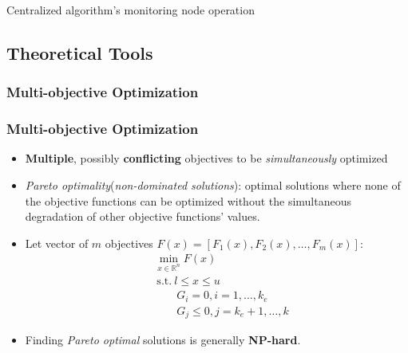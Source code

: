 \documentclass[hyperref={pdfpagelabels=false}]{beamer}
\begin{document}
\begin{frame}[plain]
{\begin{minipage}{\linewidth}
\begin{algorithm}[H]
{{{		


		}
	}
}
\caption{Centralized algorithm's monitoring node operation \label{algo:centralizedMonitoringNode}} 
\end{algorithm}
\end{minipage}%
}
\end{frame}

\subsection{Theoretical Tools}
\subsubsection*{Multi-objective Optimization}
\begin{frame} \frametitle{Multi-objective Optimization}
\begin{itemize}
\item \textbf{Multiple}, possibly \textbf{conflicting} objectives to be \emph{simultaneously} optimized
\item \emph{Pareto optimality}(\emph{non-dominated solutions}): optimal solutions where none of the objective functions can be optimized without the simultaneous degradation of other objective functions' values.
\item Let vector of $m$ objectives $F(x)=[F_1(x), F_2(x), \dots, F_m(x)]$:
\begin{align*}
&\min_{x \in \mathbb{R}^n}{F(x)}\\
&\ \text{s.t.}\ l\leq x \leq u \\
			&\qquad G_i=0, i=1,\dots,k_e\\
			&\qquad G_j\leq 0, j=k_e+1, \dots,k
\end{align*}
\item Finding \emph{Pareto optimal} solutions is generally \textbf{NP-hard}.
\end{itemize}
\end{frame}
\end{document}
